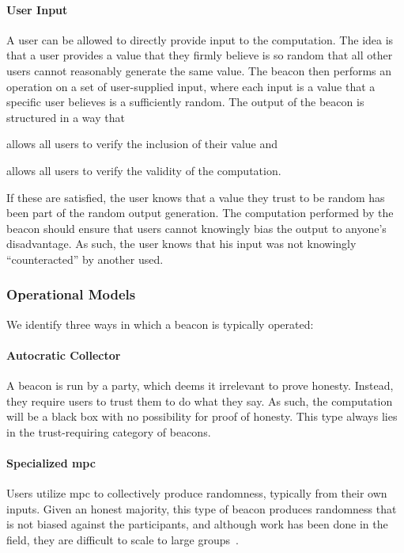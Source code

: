 \paragraph{User Input}
A user can be allowed to directly provide input to the computation.
The idea is that a user provides a value that they firmly believe is so random that all other users cannot reasonably generate the same value.
The beacon then performs an operation on a set of user-supplied input, where each input is a value that a specific user believes is a sufficiently random. The output of the beacon is structured in a way that
\begin{eletterate*}
    \item allows all users to verify the inclusion of their value and
    \item allows all users to verify the validity of the computation.
\end{eletterate*}

If these are satisfied, the user knows that a value they trust to be random has been part of the random output generation. The computation performed by the beacon should ensure that users cannot knowingly bias the output to anyone's disadvantage. As such, the user knows that his input was not knowingly \enquote{counteracted} by another used.

\subsubsection{Operational Models}
We identify three ways in which a beacon is typically operated:

\paragraph{Autocratic Collector} A beacon is run by a party, which deems it irrelevant to prove honesty. Instead, they require users to trust them to do what they say. As such, the computation will be a black box with no possibility for proof of honesty. This type always lies in the trust-requiring category of beacons.

\paragraph{Specialized \acrshort{mpc}} Users utilize \acrfull{mpc} to collectively produce randomness, typically from their own inputs. Given an honest majority, this type of beacon produces randomness that is not biased against the participants, and although work has been done in the field, they are difficult to scale to large groups~\cite{cascudo2017scrape, syta2017scalable}.

